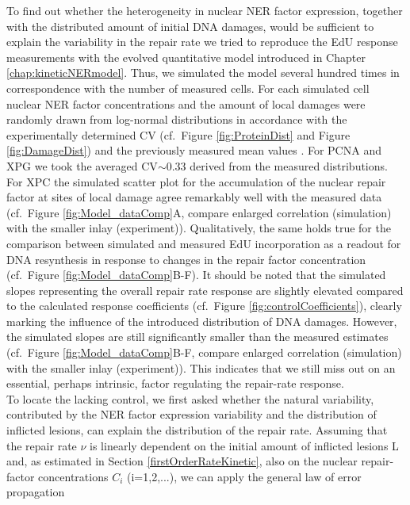 To find out whether the heterogeneity in nuclear NER factor expression, together with the distributed amount of initial DNA damages, would be sufficient to explain the variability in the repair rate we tried to reproduce the EdU response measurements with the evolved quantitative model introduced in Chapter \ref{chap:kineticNERmodel}. Thus, we simulated the model several hundred times in correspondence with the number of measured cells. For each simulated cell nuclear NER factor concentrations and the amount of local damages were randomly drawn from log-normal distributions in accordance with the experimentally determined CV (cf.\ Figure \ref{fig:ProteinDist} and Figure \ref{fig:DamageDist}) and the previously measured mean values \cite{Luijsterburg2010}. For PCNA and XPG we took the averaged CV$\sim$0.33 derived from the measured distributions. \\
For XPC the simulated scatter plot for the accumulation of the nuclear repair factor at sites of local damage agree remarkably well with the measured data (cf.\ Figure \ref{fig:Model_dataComp}A, compare enlarged correlation (simulation) with the smaller inlay (experiment)). Qualitatively, the same holds true for the comparison between simulated and measured EdU incorporation as a readout for DNA resynthesis in response to changes in the repair factor concentration (cf.\ Figure \ref{fig:Model_dataComp}B-F). It should be noted that the simulated slopes representing the overall repair rate response are slightly elevated compared to the calculated response coefficients (cf.\ Figure \ref{fig:controlCoefficients}), clearly marking the influence of the introduced distribution of DNA damages. However, the simulated slopes are still significantly smaller than the measured estimates (cf.\ Figure \ref{fig:Model_dataComp}B-F, compare enlarged correlation (simulation) with the smaller inlay (experiment)). This indicates that we still miss out on an essential, perhaps intrinsic, factor regulating the repair-rate response.\\    
To locate the lacking control, we first asked whether the natural variability, contributed by the NER factor expression variability and the distribution of inflicted lesions, can explain the distribution of the repair rate. Assuming that the repair rate $\nu$ is linearly dependent on the initial amount of inflicted lesions L and, as estimated in Section \ref{firstOrderRateKinetic}, also on the nuclear repair-factor concentrations $C_i$ (i=1,2,...), we can apply the general law of error propagation

